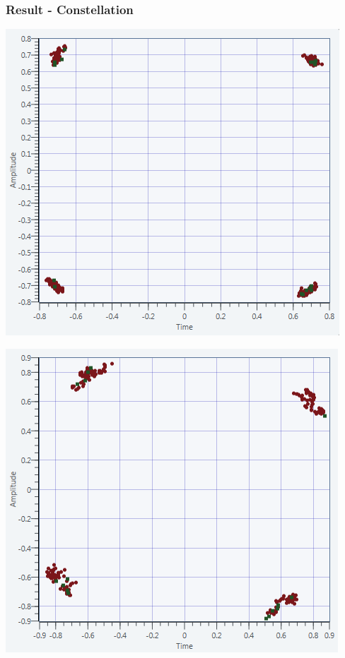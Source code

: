 \documentclass[11pt]{beamer}
\begin{document}
\begin{frame}
\frametitle{Result - Constellation}
\begin{minipage}[b]{0.48\linewidth}
        \centering \includegraphics[scale=0.35]{img/USRP_carrieroffset_227.png}
    \end{minipage}\hfill
    \begin{minipage}[b]{0.48\linewidth}
         \centering \includegraphics[scale=0.35]{img/USRP_carrieroffset_1818}
    \end{minipage}

\end{frame}
\end{document}

